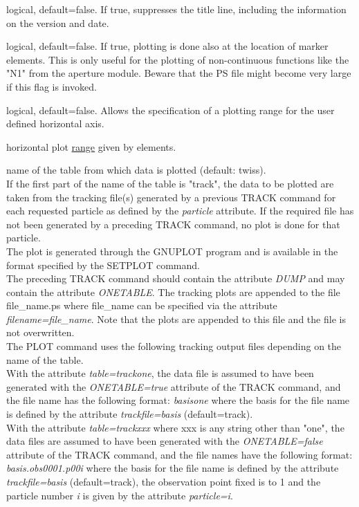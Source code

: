 \begin{madlist}
    logical, default=false. If true, suppresses the title
     line, including the information on the version and date.  

    logical, default=false. If true, plotting is done
     also at the location of marker elements. This is only useful for
     the plotting of non-continuous functions like the "N1" from the
     aperture module. Beware that the PS file might become very large if
     this flag is invoked.
  
    logical, default=false. Allows the specification
     of a plotting range for the user defined horizontal axis.   

    horizontal plot \hyperref[sec:range]{range} given by
   elements.   

    name of the table from which data is plotted (default:
     twiss). \\ 
     If the first part of the name of the table is "track", the
     data to be plotted are taken from the tracking file(s) generated by
     a previous TRACK command for each requested particle as defined by
     the \textit{particle} attribute. If the required file has not been
     generated by a preceding TRACK command, no plot is done for that
     particle. \\  
     The plot is generated through the GNUPLOT program and is available
     in the format specified by the SETPLOT command. \\ 
     The preceding TRACK command should contain the attribute \textit{DUMP}
     and may contain the attribute \textit{ONETABLE}. The tracking plots
     are appended to the file file\_name.ps where file\_name can be
     specified via the attribute \textit{filename=file\_name}. Note that
     the plots are appended to this file and the file is not
     overwritten. \\
     The PLOT command uses the following tracking output files depending on
     the name of the table.\\  
     With the attribute \textit{table=trackone}, the data file is assumed
     to have been generated with the \textit{ONETABLE=true} attribute of
     the TRACK command, and the file name has the following format: 
     \textit{basisone} where the basis for the file name is defined by the
     attribute \textit{trackfile=basis} (default=track).\\
     With the attribute \textit{table=trackxxx} where xxx is any string
     other than "one", the data files are assumed to have been generated
     with the \textit{ONETABLE=false} attribute of the TRACK command, and
     the file names have the following format: \textit{basis.obs0001.p00i}
     where the basis for the file name is defined by the attribute
     \textit{trackfile=basis} (default=track), the observation point fixed
     is to 1 and the particle number \textit{i} is given by the attribute
     \textit{particle=i}.
 

\end{madlist}
